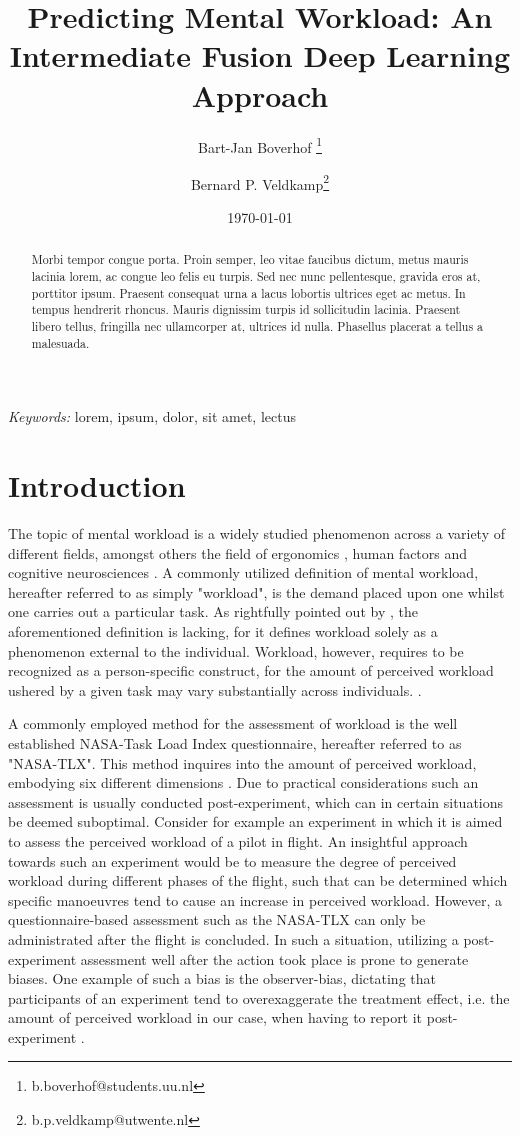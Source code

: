 \documentclass[12pt]{article}
\title{Predicting  Mental Workload: An Intermediate Fusion Deep Learning Approach}
\author[1]{Bart-Jan Boverhof \thanks{b.boverhof@students.uu.nl}}
\author[2]{Bernard P. Veldkamp\thanks{b.p.veldkamp@utwente.nl}}
\affil[1]{\normalsize Faculty of Behavioral, Management and Social Sciences, University of Twente}
\affil[2]{\normalsize Faculty of Social and Behavioural Sciences, Utrecht University}
\date{\today}
\begin{document}
\maketitle

\begin{abstract}
Morbi tempor congue porta. Proin semper, leo vitae faucibus dictum, metus mauris lacinia lorem, ac congue leo felis eu turpis. Sed nec nunc pellentesque, gravida eros at, porttitor ipsum. Praesent consequat urna a lacus lobortis ultrices eget ac metus. In tempus hendrerit rhoncus. Mauris dignissim turpis id sollicitudin lacinia. Praesent libero tellus, fringilla nec ullamcorper at, ultrices id nulla. Phasellus placerat a tellus a malesuada.
\end{abstract}

\hspace*{3.6mm}\textit{Keywords:} lorem, ipsum, dolor, sit amet, lectus %

\newpage
\section{Introduction}
The topic of mental workload is a widely studied phenomenon across a variety of different fields, amongst others the field of ergonomics \cite{young2015state}, human factors \cite{pretorius2007development} and cognitive neurosciences \cite{shuggi2017mental}. A commonly utilized definition of mental workload, hereafter referred to as simply "workload", is the demand placed upon one whilst one carries out a particular task. As rightfully pointed out by , the aforementioned definition is lacking, for it defines workload solely as a phenomenon external to the individual. Workload, however, requires to be recognized as a person-specific construct, for the amount of perceived workload ushered by a given task may vary substantially across individuals. \cite{de1996measurement}. 

A commonly employed method for the assessment of workload is the well established NASA-Task Load Index questionnaire, hereafter referred to as "NASA-TLX". This method inquires into the amount of perceived workload,  embodying six different dimensions \cite{hart2006nasa}. Due to practical considerations such an assessment is usually conducted post-experiment, which can in certain situations be deemed suboptimal. Consider for example an experiment in which it is aimed to assess the perceived workload of a pilot in flight. An insightful  approach towards such an experiment would be to measure the degree of perceived workload during different phases of the flight, such that can be determined which specific manoeuvres tend to cause an increase in perceived workload.  However,  a questionnaire-based assessment such as the NASA-TLX can only be administrated after the flight is concluded. In such a situation, utilizing a post-experiment assessment well after the action took place is prone to generate biases. One example of such a bias is the observer-bias, dictating that participants of an experiment tend to overexaggerate the treatment effect, i.e. the amount of perceived workload in our case, when having to report it post-experiment \cite{mahtani2018catalogue}.
\end{document}
